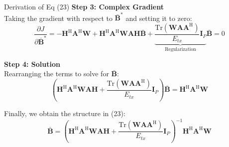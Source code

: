 \documentclass[aspectratio=169, 10pt]{beamer}
\begin{document}
\begin{frame}{Derivation of Eq (23)}
    \footnotesize
    \textbf{Step 3: Complex Gradient} \\
    Taking the gradient with respect to $\bar{\mathbf{B}}^*$ and setting it to zero:
    \begin{equation*}
        \frac{\partial J}{\partial \bar{\mathbf{B}}^*} = -\mathbf{H}^\mathrm{H} \mathbf{A}^\mathrm{H} \mathbf{W} + \mathbf{H}^\mathrm{H} \mathbf{A}^\mathrm{H} \mathbf{W} \mathbf{A} \mathbf{H} \bar{\mathbf{B}} + \underbrace{\frac{\mathrm{Tr}(\mathbf{W}\mathbf{A}\mathbf{A}^\mathrm{H})}{E_{tx}} \mathbf{I}_P}_{\mathrm{Regularization}} \bar{\mathbf{B}} = 0
    \end{equation*}

    \textbf{Step 4: Solution} \\
    Rearranging the terms to solve for $\bar{\mathbf{B}}$:
    \begin{equation*}
        \left( \mathbf{H}^\mathrm{H} \mathbf{A}^\mathrm{H} \mathbf{W} \mathbf{A} \mathbf{H} + \frac{\mathrm{Tr}(\mathbf{W}\mathbf{A}\mathbf{A}^\mathrm{H})}{E_{tx}} \mathbf{I}_P \right) \bar{\mathbf{B}} = \mathbf{H}^\mathrm{H} \mathbf{A}^\mathrm{H} \mathbf{W}
    \end{equation*}

    Finally, we obtain the structure in (23):
    \begin{equation*}
        \bar{\mathbf{B}} = \left( \mathbf{H}^\mathrm{H} \mathbf{A}^\mathrm{H} \mathbf{W} \mathbf{A} \mathbf{H} + \frac{\mathrm{Tr}(\mathbf{W}\mathbf{A}\mathbf{A}^\mathrm{H})}{E_{tx}} \mathbf{I}_P \right)^{-1} \mathbf{H}^\mathrm{H} \mathbf{A}^\mathrm{H} \mathbf{W}
    \end{equation*}

    \begin{flushright}
        \hyperlink{main-update_B}{}
    \end{flushright}
\end{frame}
\end{document}

